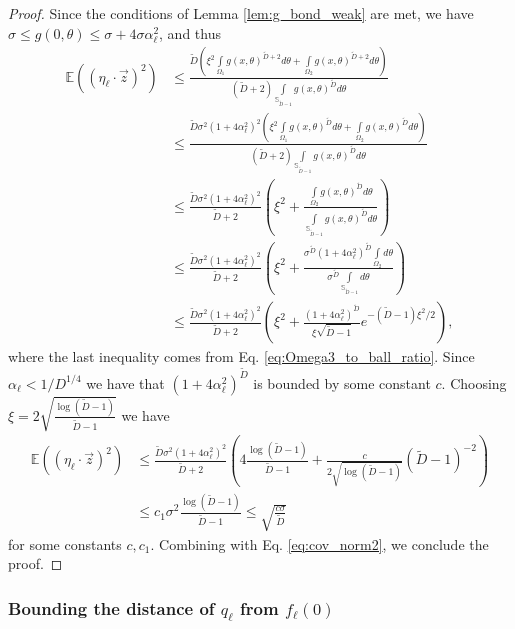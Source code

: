 \documentclass[12pt]{article}
\theoremstyle{remark}
\newcommand{\EE}{\mathbb{E}}
\newcommand{\wtilde}[1]{\widetilde{#1}}
\begin{document}
\begin{appendices}
\begin{proof}
Since the conditions of Lemma \ref{lem:g_bond_weak} are met, we have $\sigma \leq g(0,\theta)\leq \sigma + 4\sigma \alpha_\ell ^2$, and thus
\begin{align*}
\EE((\eta_\ell\cdot \vec{z})^2)
&\leq  \frac{\wtilde D\left(\xi^2 \int\limits_{\Omega_1} g(x,\theta)^{\wtilde D+2} d\theta + \int\limits_{\Omega_2} g(x,\theta)^{\wtilde D+2} d\theta\right)}{(\wtilde D+2)\int\limits_{\mathbb{S}_{\wtilde D-1}}g(x,\theta)^{\wtilde D} d\theta}
\\
&\leq  \frac{\wtilde D\sigma^2(1+4\alpha_\ell ^2)^2\left(\xi^2  \int\limits_{\Omega_1} g(x,\theta)^{\wtilde D} d\theta + \int\limits_{\Omega_2} g(x,\theta)^{\wtilde D} d\theta\right)}{(\wtilde D+2)\int\limits_{\mathbb{S}_{\wtilde D-1}}g(x,\theta)^{\wtilde D} d\theta}
\\
&\leq  \frac{\wtilde D\sigma^2(1+4\alpha_\ell ^2)^2}{\wtilde D+2}\left(\xi^2  +\frac{ \int\limits_{\Omega_2} g(x,\theta)^{\wtilde D} d\theta}{\int\limits_{\mathbb{S}_{\wtilde D-1}}g(x,\theta)^{\wtilde D} d\theta} \right)
\\
&\leq  \frac{\wtilde D\sigma^2(1+4\alpha_\ell ^2)^2}{\wtilde D+2}\left(\xi^2  +\frac{\sigma^{\wtilde D}(1+4\alpha_\ell ^2)^{\wtilde D} \int\limits_{\Omega_2} d\theta}{\sigma^{\wtilde D}\int\limits_{\mathbb{S}_{\wtilde D-1}} d\theta} \right)
\\
&\leq  \frac{\wtilde D\sigma^2(1+4\alpha_\ell ^2)^2}{\wtilde D+2}\left(\xi^2 +\frac{(1+4\alpha_\ell ^2)^{\wtilde D}}{\xi\sqrt{\wtilde D-1}} e^{-(\wtilde D-1)\xi^2/2}\right)
,\end{align*}
where the last inequality comes from Eq. \eqref{eq:Omega3_to_ball_ratio}.
Since $\alpha_\ell <1/D^{1/4}$ we have that $(1+4\alpha_\ell ^2)^{\wtilde D}$ is bounded by some constant $c$. Choosing $\xi = 2\sqrt{\frac{\log(\wtilde D-1)}{\wtilde D-1}}$ we have 
\begin{align*}
\EE((\eta_\ell\cdot \vec{z})^2)
&\leq  \frac{\wtilde D\sigma^2(1+4\alpha_\ell ^2)^2 }{\wtilde D+2}\left(4\frac{\log(\wtilde D-1)}{\wtilde D-1} +\frac{c}{2\sqrt{\log(\wtilde D-1)}} (\wtilde D-1)^{-2}\right)
\\
&\leq  c_1\sigma^2\frac{\log(\wtilde D-1)}{\wtilde D-1}\leq  \sqrt{\frac{c\sigma}{\wtilde D}}
\end{align*}
for some constants $c,c_1$. Combining with Eq. 
\eqref{eq:cov_norm2}, we conclude the proof.

\end{proof}




\subsubsection{Bounding the distance of $q_\ell$ from $f_\ell(0)$}\label{sec:f0_est}



\end{appendices}
\end{document}
